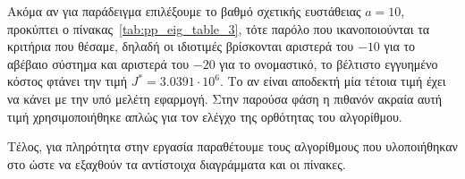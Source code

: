 Ακόμα αν για παράδειγμα επιλέξουμε το βαθμό σχετικής
ευστάθειας \( a = 10 \), προκύπτει ο πίνακας~\ref{tab:pp_eig_table_3}, τότε παρόλο που
ικανοποιούνται τα κριτήρια που θέσαμε, δηλαδή οι ιδιοτιμές βρίσκονται αριστερά
του \( -10 \) για το αβέβαιο σύστημα και αριστερά του \( -20 \) για το ονομαστικό,
το βέλτιστο εγγυημένο κόστος φτάνει την τιμή \( J^* = 3.0391 \cdot 10^6 \).
Το αν είναι αποδεκτή μία τέτοια τιμή έχει να κάνει με την υπό μελέτη εφαρμογή.
Στην παρούσα φάση η πιθανόν ακραία αυτή τιμή χρησιμοποιήθηκε απλώς για τον ελέγχο της
ορθότητας του αλγορίθμου.

Τέλος, για πληρότητα στην εργασία παραθέτουμε τους αλγορίθμους που υλοποιήθηκαν
στο  ώστε να εξαχθούν τα αντίστοιχα διαγράμματα και οι πίνακες.
\eng{}
